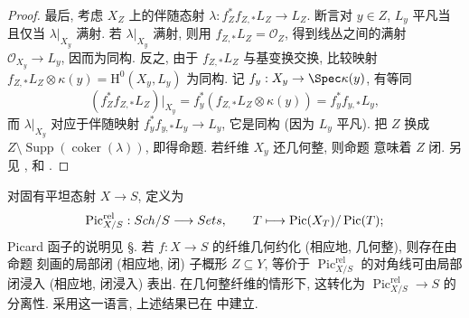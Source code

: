 \begin{proof}
最后, 考虑 $X_Z$ 上的伴随态射 $\lambda:f_Z^*f_{Z,*}L_Z\to L_Z$. 断言对 $y\in Z$, $L_y$ 平凡当且仅当 $\lambda|_{X_y}$ 满射. 若 $\lambda|_{X_y}$ 满射, 则用 $f_{Z,*}L_Z=\mathcal O_Z$, 得到线丛之间的满射 $\mathcal O_{X_y}\to L_y$, 因而为同构. 反之, 由于 $f_{Z,*}L_Z$ 与基变换交换, 比较映射 $f_{Z,*}L_Z\otimes\kappa(y)=\mathrm H^0(X_y,L_y)$ 为同构. 记 $f_y:X_y\to\Spec\kappa(y)$, 有等同
\[
(f_Z^*f_{Z,*}L_Z)|_{X_y}=f_y^*(f_{Z,*}L_Z\otimes\kappa(y))=f_y^*f_{y,*}L_y,
\]
而 $\lambda|_{X_y}$ 对应于伴随映射 $f_y^*f_{y,*}L_y\to L_y$, 它是同构 (因为 $L_y$ 平凡). 把 $Z$ 换成 $Z\setminus\operatorname{Supp}(\operatorname{coker}(\lambda))$, 即得命题. 若纤维 $X_y$ 还几何整, 则命题  意味着 $Z$ 闭. 另见 \cite[第 $90$ 页]{Mum70a}, \cite[引理 $1.19$]{Vie95} 和 \cite[Tags 0BEZ, 0BF0]{SP}.
\end{proof}
\begin{remark}\label{src:A.6.20}
对固有平坦态射 $X\to S$,  定义为
\[
\operatorname{Pic}_{X/S}^{\mathrm{rel}}:Sch/S\longrightarrow Sets,\qquad T\longmapsto\operatorname{Pic}(X_T)/\operatorname{Pic}(T);
\]
Picard 函子的说明见 \S{}. 若 $f:X\to S$ 的纤维几何约化 (相应地, 几何整), 则存在由命题  刻画的局部闭 (相应地, 闭) 子概形 $Z\subseteq Y$, 等价于 $\operatorname{Pic}_{X/S}^{\mathrm{rel}}$ 的对角线可由局部闭浸入 (相应地, 闭浸入) 表出. 在几何整纤维的情形下, 这转化为 $\operatorname{Pic}_{X/S}^{\mathrm{rel}}\to S$ 的分离性. 采用这一语言, 上述结果已在 \cite[定理 $3.1$]{FGAV} 中建立.
\end{remark}
